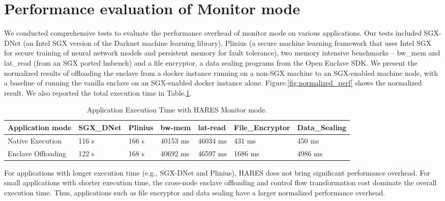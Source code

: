 \documentclass[article, doublespace,nopageskip]{VTthesis} %
\newcommand{\monitor}{HARES }
\begin{document}
    \section{Performance evaluation of Monitor mode} \label{ase:performance evaluation of monitor mode}
    We conducted comprehensive tests to evaluate the performance overhead of monitor mode on various applications. Our tests included SGX-DNet (an Intel SGX version of the Darknet machine learning library), Plinius (a secure machine learning framework that uses Intel SGX for secure training of neural network models and persistent memory for fault tolerance), two memory intensive benchmarks – bw\_mem and lat\_read (from an SGX ported lmbench) and a file encryptor, a data sealing programs from the Open Enclave SDK. We present the normalized results of offloading the enclave from a docker instance running on a non-SGX machine to an SGX-enabled machine node, with a baseline of running the vanilla enclave on an SGX-enabled docker instance alone. Figure.\ref{fig:normalized_perf}  shows the normalized result. We also reported the total execution time in Table.\ref{tab:exe_time}.

    \begin{table}[t]
    \caption{Application Execution Time with \monitor Monitor mode.}
    \footnotesize
    \centering
    \begin{tabular}{|l|l|l|l|l|l|l|}
        \hline
        Application mode & SGX\_DNet & Plinius & bw-mem & lat-read & File\_Encryptor & Data\_Sealing \\ \hline
        Native Execution   & 116 s & 166 s   & 40153 ms & 46034 ms & 431 ms  & 450 ms      \\ \hline
        Enclave Offloading & 122 s & 168 s   & 40692 ms & 46597 ms & 1686 ms & 4986 ms     \\ \hline
    \end{tabular}
    \label{tab:exe_time}
    \end{table}

    For applications with longer execution time (e.g., SGX-DNet and Plinius), \monitor does not bring significant performance overhead. For small applications with shorter execution time, the cross-node enclave offloading and control flow transformation cost dominate
    the overall execution time. Thus, applications such as file encryptor and data sealing have a larger normalized performance overhead. 
\end{document}
